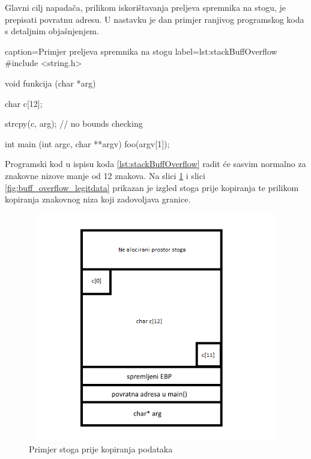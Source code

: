 \documentclass[times, utf8, diplomski, numeric]{fer}
\begin{document}
Glavni cilj napadača, prilikom iskorištavanja preljeva spremnika
na stogu, je prepisati povratnu adresu. U nastavku je dan primjer
ranjivog programskog koda s detaljnim objašnjenjem.

\begin{ispis} {caption=Primjer preljeva spremnika na stogu} {label=lst:stackBuffOverflow}
#include <string.h>
 
void funkcija (char *arg)
{
   char  c[12];
 
   strcpy(c, arg);  // no bounds checking
}
 
int main (int argc, char **argv)
{
   foo(argv[1]);
}
\end{ispis}

Programski kod u ispisu koda \ref{lst:stackBuffOverflow} radit će
sasvim normalno za znakovne nizove manje od 12 znakova. Na slici 
\ref{fig:buff_overflow_nodata} i slici 
\ref{fig:buff_overflow_legitdata} prikazan je izgled stoga prije
kopiranja te prilikom kopiranja znakovnog niza koji zadovoljava
granice.

\begin{figure}[!ht]
\centering
\setlength\fboxsep{0pt}
\setlength\fboxrule{0.5pt}
\includegraphics[width=12cm, height=10cm]{slike/buffer_overflow_nodata}
\caption{Primjer stoga prije kopiranja podataka}
\label{fig:buff_overflow_nodata} 
\end{figure} 
\end{document}
